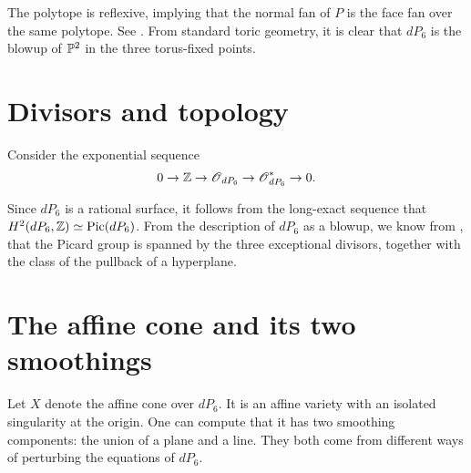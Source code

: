The polytope is reflexive, implying that the normal fan of $P$ is the face fan over the same polytope. See . From standard toric geometry, it is clear that $dP_6$ is the blowup of $\mathbb{P}^2$ in the three torus-fixed points. 

\section{Divisors and topology}

Consider the exponential sequence
\[
0 \to \mathbb{Z} \to \operatorname{\mathscr{O}}_{dP_6} \to \operatorname{\mathscr{O}}_{dP_6}^\ast \to 0.
\]

Since $dP_6$ is a rational surface, it follows from the long-exact sequence that $H^2(dP_6,\mathbb{Z}) \simeq \operatorname{Pic}(dP_6)$. From the description of $dP_6$ as a blowup, we know from \cite[Chapter V]{hartshorne}, that the Picard group is spanned by the three exceptional divisors, together with the class of the pullback of a hyperplane. 


\section{The affine cone and its two smoothings}

Let $X$ denote the affine cone over $dP_6$. It is an affine variety with an isolated singularity at the origin. One can compute that it has two smoothing components: the union of a plane and a line. They both come from different ways of perturbing the equations of $dP_6$.

